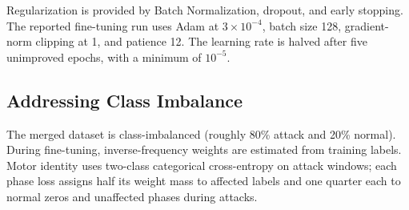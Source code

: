 \documentclass[conference]{IEEEtran}
\begin{document}
Regularization is provided by Batch Normalization, dropout, and early stopping. The reported fine-tuning run uses Adam at $3\times10^{-4}$, batch size 128, gradient-norm clipping at 1, and patience 12. The learning rate is halved after five unimproved epochs, with a minimum of $10^{-5}$.

\subsection{Addressing Class Imbalance}

The merged dataset is class-imbalanced (roughly 80\% attack and 20\% normal). During fine-tuning, inverse-frequency weights are estimated from training labels. Motor identity uses two-class categorical cross-entropy on attack windows; each phase loss assigns half its weight mass to affected labels and one quarter each to normal zeros and unaffected phases during attacks.
\end{document}
